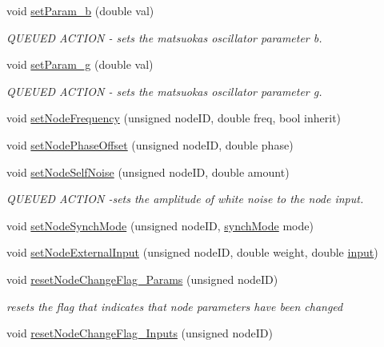 \begin{DoxyCompactItemize}
void \hyperlink{classMatsuokaEngine_aa568d548269415a9104a74eaec19d958}{set\+Param\+\_\+b} (double val)
\begin{DoxyCompactList}\small\item\em Q\+U\+E\+U\+ED A\+C\+T\+I\+ON -\/ sets the matsuoka\textquotesingle{}s oscillator parameter b. \end{DoxyCompactList}\item 
void \hyperlink{classMatsuokaEngine_aba4ab083a57717c7dba5d75ff3d1987a}{set\+Param\+\_\+g} (double val)
\begin{DoxyCompactList}\small\item\em Q\+U\+E\+U\+ED A\+C\+T\+I\+ON -\/ sets the matsuoka\textquotesingle{}s oscillator parameter g. \end{DoxyCompactList}\item 
void \hyperlink{classMatsuokaEngine_acd76608c9b7fb30bf9e0ed2ecd1ba40a}{set\+Node\+Frequency} (unsigned node\+ID, double freq, bool inherit)
\item 
void \hyperlink{classMatsuokaEngine_a858deaa3246c884cc0693b494e398849}{set\+Node\+Phase\+Offset} (unsigned node\+ID, double phase)
\item 
void \hyperlink{classMatsuokaEngine_a4e564e80779a3cd89cb3d4347920ba7d}{set\+Node\+Self\+Noise} (unsigned node\+ID, double amount)
\begin{DoxyCompactList}\small\item\em Q\+U\+E\+U\+ED A\+C\+T\+I\+ON -\/sets the amplitude of white noise to the node input. \end{DoxyCompactList}\item 
void \hyperlink{classMatsuokaEngine_aa037d1bcb48e395ef6e789feab20b144}{set\+Node\+Synch\+Mode} (unsigned node\+ID, \hyperlink{classMatsuNode_a725e228db39b8842f851ddf88f640bed}{synch\+Mode} mode)
\item 
void \hyperlink{classMatsuokaEngine_a8eb38eaa5de05677243c5c7cd809af4d}{set\+Node\+External\+Input} (unsigned node\+ID, double weight, double \hyperlink{classMatsuokaEngine_a811a5449f07004a2eb6b34e8c9bd862f}{input})
\item 
void \hyperlink{classMatsuokaEngine_afc55b8350937748e0c0187a08130ca31}{reset\+Node\+Change\+Flag\+\_\+\+Params} (unsigned node\+ID)
\begin{DoxyCompactList}\small\item\em resets the flag that indicates that node parameters have been changed \end{DoxyCompactList}\item 
void \hyperlink{classMatsuokaEngine_a19fd8a9446e6bea6986d8de5c5c7bfd1}{reset\+Node\+Change\+Flag\+\_\+\+Inputs} (unsigned node\+ID)

\end{DoxyCompactItemize}
